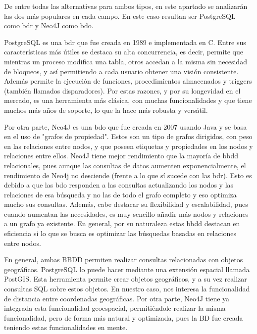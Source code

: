     De entre todas las alternativas para ambos tipos, en este apartado se analizarán las dos más populares en cada campo. En este caso resultan ser PostgreSQL\cite{postgres} como \ac{bdr} y Neo4J\cite{neo4j} como \ac{bdo}.
    
    PostgreSQL es una \ac{bdr} que fue creada en 1989 e implementada en C. Entre sus características más útiles se destaca su alta concurrencia, es decir, permite que mientras un proceso modifica una tabla, otros accedan a la misma sin necesidad de bloqueos, y así permitiendo a cada usuario obtener una visión consistente. Además permite la ejecución de funciones, procedimientos almacenados y triggers (también llamados disparadores).
    Por estas razones, y por su longevidad en el mercado, es una herramienta más clásica, con muchas funcionalidades y que tiene muchos más años de soporte, lo que la hace más robusta y versátil.
    
    Por otra parte, Neo4J es una \ac{bdo} que fue creada en 2007 usando Java y se basa en el uso de "grafos de propiedad". Estos son un tipo de grafos dirigidos, con peso en las relaciones entre nodos, y que poseen etiquetas y propiedades en los nodos y relaciones entre ellos. Neo4J tiene mejor rendimiento que la mayoría de \ac{bbdd} relacionales, pues aunque las consultas de datos aumenten exponencialmente, el rendimiento de Neo4j no desciende (frente a lo que sí sucede con las \ac{bdr}). Esto es debido a que las \ac{bdo} responden a las consultas actualizando los nodos y las relaciones de esa búsqueda y no las de todo el grafo completo y eso optimiza mucho sus consultas.
    Además, cabe destacar su flexibilidad y escalabilidad, pues cuando aumentan las necesidades, es muy sencillo añadir más nodos y relaciones a un grafo ya existente.
    En general, por su naturaleza estas \ac{bbdd} destacan en eficiencia si lo que se busca es optimizar las búsquedas basadas en relaciones entre nodos. 
    
    En general, ambas BBDD permiten realizar consultas relacionadas con objetos geográficos.
    PostgreSQL lo puede hacer mediante una extensión espacial llamada PostGIS\cite{postgis}. Esta herramienta permite crear objetos geográficos, y a su vez realizar consultas SQL sobre estos objetos. En nuestro caso, nos interesa la funcionalidad de distancia entre coordenadas geográficas.
    Por otra parte, Neo4J tiene ya integrada esta funcionalidad geoespacial, permitiéndole realizar la misma funcionalidad, pero de forma más natural y optimizada, pues la BD fue creada teniendo estas funcionalidades en mente.
    
